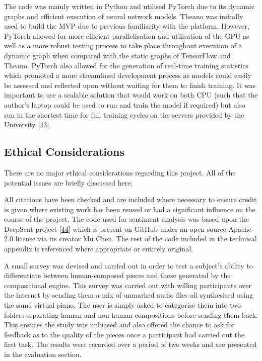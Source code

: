 \documentclass[12pt,]{article}
\begin{document}
The code was mainly written in Python and utilised PyTorch due to its
dynamic graphs and efficient execution of neural network models. Theano
was initially used to build the MVP due to previous familiarity with the
platform. However, PyTorch allowed for more efficient parallelisation
and utilisation of the GPU as well as a more robust testing process to
take place throughout execution of a dynamic graph when compared with
the static graphs of TensorFlow and Theano. PyTorch also allowed for the
generation of real-time training statistics which promoted a more
streamlined development process as models could easily be assessed and
reflected upon without waiting for them to finish training. It was
important to use a scalable solution that would work on both CPU (such
that the author's laptop could be used to run and train the model if
required) but also run in the shortest time for full training cycles on
the servers provided by the University
{[}\protect\hyperlink{ref-warwickcomputenodes}{43}{]}.

\hypertarget{ethical-considerations}{%
\subsection{Ethical Considerations}\label{ethical-considerations}}

There are no major ethical considerations regarding this project. All of
the potential issues are briefly discussed here.

All citations have been checked and are included where necessary to
ensure credit is given where existing work has been reused or had a
significant influence on the course of the project. The code used for
sentiment analysis was based upon the DeepSent project
{[}\protect\hyperlink{ref-deepsent}{44}{]} which is present on GitHub
under an open source Apache 2.0 license via its creator Mu Chen. The
rest of the code included in the technical appendix is referenced where
appropriate or entirely original.

A small survey was devised and carried out in order to test a subject's
ability to differentiate between human-composed pieces and those
generated by the compositional engine. This survey was carried out with
willing participants over the internet by sending them a mix of unmarked
audio files all synthesised using the same virtual piano. The user is
simply asked to categorise them into two folders separating human and
non-human compositions before sending them back. This ensures the study
was unbiased and also offered the chance to ask for feedback as to the
quality of the pieces once a participant had carried out the first task.
The results were recorded over a period of two weeks and are presented
in the evaluation section.
\end{document}
